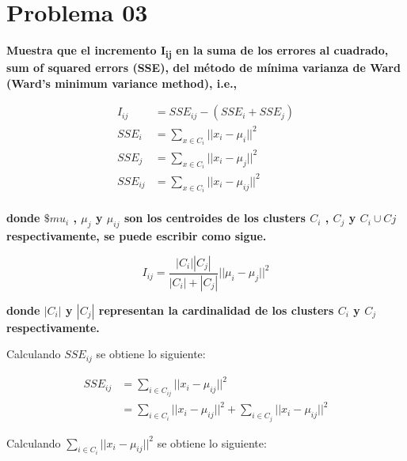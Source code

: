 
\section*{Problema 03}

\textbf{Muestra que el incremento I\textsubscript{ij} en la suma de los errores al cuadrado, sum of squared errors (SSE), del método de mínima varianza de Ward (Ward's minimum variance method), i.e.,}

\begin{align*}
    I_{ij}   & = SSE_{ij} -(SSE_{i}+SSE_{j})         \\
    SSE_i    & =\sum_{x\in C_i} ||x_i - \mu_i||^2    \\
    SSE_j    & =\sum_{x\in C_i} ||x_i - \mu_j||^2    \\
    SSE_{ij} & =\sum_{x\in C_i} ||x_i - \mu_{ij}||^2 \\
\end{align*}

\textbf{donde $\$mu_i$ , $\mu_j$ y $\mu_{ij}$ son los centroides de los clusters $C_i$ , $C_j$ y $C_i \cup Cj$ respectivamente, se puede escribir como sigue.}

\begin{equation*}
    I_{ij} = \frac{|C_i||C_j|}{|C_i|+|C_j|} ||\mu_i-\mu_j||^2
\end{equation*}

\textbf{donde $|C_i|$ y $|C_j|$ representan la cardinalidad de los clusters $C_i$ y $C_j$ respectivamente.}


Calculando $SSE_{ij}$ se obtiene lo siguiente:

\begin{align*}
    SSE_{ij} & = \sum_{i\in C_{ij}} ||x_i-\mu_{ij}||^2                                     \\
             & = \sum_{i \in C_i} ||x_i-\mu_{ij}||^2  +\sum_{i \in C_j} ||x_i-\mu_{ij}||^2
\end{align*}


Calculando $\sum_{i \in C_i} ||x_i-\mu_{ij}||^2$ se obtiene lo siguiente:

